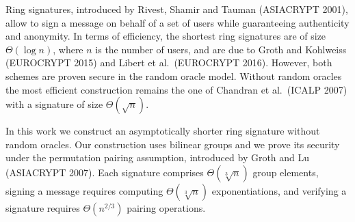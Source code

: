 Ring signatures, introduced by Rivest, Shamir and Tauman (ASIACRYPT 2001), allow to sign a message on behalf of a set of users while guaranteeing authenticity and anonymity. In terms of efficiency, the shortest ring signatures are of size $\Theta(\log n)$, where $n$ is the number of users, and are due to Groth and Kohlweiss (EUROCRYPT 2015) and Libert et al.~(EUROCRYPT 2016). However, both schemes are proven secure in the random oracle model. Without random oracles the most efficient construction remains the one of Chandran et al.~(ICALP 2007) with a signature of size $\Theta(\sqrt{n})$.

In this work we construct an asymptotically shorter ring signature without random oracles. Our construction uses bilinear groups and we prove its security under the permutation pairing assumption, introduced by Groth and Lu (ASIACRYPT 2007).
 Each signature comprises $\Theta(\sqrt[3]{n})$ group elements, signing a message requires computing $\Theta(\sqrt[3]{n})$ exponentiations, and verifying a signature requires $\Theta(n^{2/3})$ pairing operations.
